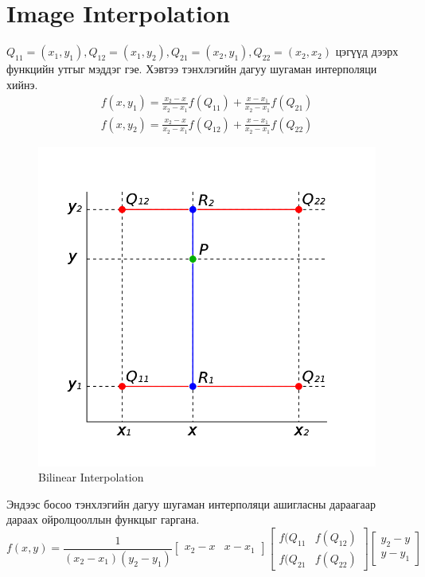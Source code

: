 \documentclass[a4paper]{article}
\begin{document}
\section{Image Interpolation}
$Q_{11} = (x_1, y_1), Q_{12} = (x_1, y_2), Q_{21} = (x_2, y_1), Q_{22} = (x_2, x_2)$ цэгүүд дээрх функцийн утгыг мэддэг гэе.
Хэвтээ тэнхлэгийн дагуу шугаман интерполяци хийнэ.
\begin{equation}
\begin{aligned}
  f(x, y_1) = \frac{x_2 - x}{x_2 - x_1}f(Q_{11}) + \frac{x - x_1}{x_2 - x_1}f(Q_{21}) \\
  f(x, y_2) = \frac{x_2 - x}{x_2 - x_1}f(Q_{12}) + \frac{x - x_1}{x_2 - x_1}f(Q_{22})
\end{aligned}
\end{equation}
\begin{figure}[H]
  \centering
  \includegraphics[scale = 0.25]{BilinearInterpolationV2.png}
  \caption[Wider Face]{Bilinear Interpolation \cite{Swienegel}}
\end{figure}
Эндээс босоо тэнхлэгийн дагуу шугаман интерполяци ашигласны дараагаар дараах ойролцооллын функцыг гаргана.
\begin{equation}
    f(x, y) = \frac{1}{(x_2 - x_1)(y_2 - y_1)}\begin{bmatrix}x_2 - x & x - x_1\end{bmatrix}\begin{bmatrix}f(Q_{11} & f(Q_{12})\\f(Q_{21} & f(Q_{22})\end{bmatrix}\begin{bmatrix}y_2 - y\\y-y_1\end{bmatrix}
\end{equation}
\end{document}
